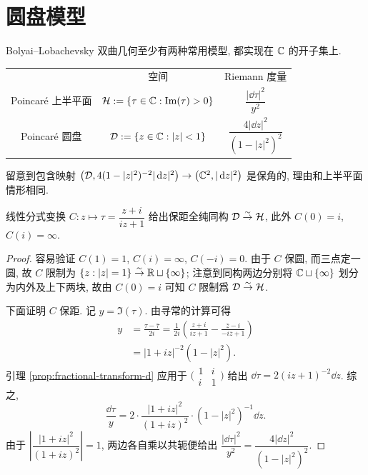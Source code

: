 \section{圆盘模型}\label{sec:disc-model} 
Bolyai--Lobachevsky 双曲几何至少有两种常用模型, 都实现在 $\mathbb{C}$ 的开子集上. 
\begin{center}\begin{tabular}{c|c|c}
	& 空间 & Riemann 度量 \\[5pt]
	Poincaré 上半平面 & $\mathcal{H} := \left\{ \tau \in \mathbb{C}: \operatorname{Im}(\tau) > 0 \right\}$ & $\dfrac{|\dd \tau|^2}{y^2}$ \\[5pt]
	Poincaré 圆盘 & $\mathcal{D} := \left\{ z \in \mathbb{C}: |z| < 1 \right\}$ & $\dfrac{4 |\dd z|^2}{(1 - |z|^2)^2}$
\end{tabular}\end{center}

留意到包含映射 $\left( \mathcal{D}, 4(1 - |z|^2)^{-2} |\mathop{}\!\mathrm{d} z|^2 \right) \to \left( \mathbb{C}^2, |\mathop{}\!\mathrm{d} z|^2 \right)$ 是保角的, 理由和上半平面情形相同.

\begin{proposition}\label{prop:hyperbolic-models}
	线性分式变换 $C: z \mapsto \tau = \dfrac{z+i}{iz+1}$ 给出保距全纯同构 $\mathcal{D} \stackrel{\sim}{\rightarrow} \mathcal{H}$, 此外 $C(0)=i$, $C(i)=\infty$.
\end{proposition}
\begin{proof}
	容易验证 $C(1) = 1$, $C(i)=\infty$, $C(-i)=0$. 由于 $C$ 保圆, 而三点定一圆, 故 $C$ 限制为 $\{z: |z|=1 \} \stackrel{\sim}{\rightarrow} \mathbb{R} \sqcup \{\infty\}$; 注意到同构两边分别将 $\mathbb{C} \sqcup \{\infty\}$ 划分为内外及上下两块, 故由 $C(0)=i$ 可知 $C$ 限制爲 $\mathcal{D} \stackrel{\sim}{\rightarrow} \mathcal{H}$.
	
	下面证明 $C$ 保距. 记 $y = \Im(\tau)$. 由寻常的计算可得
	\begin{align*}
	y & = \frac{\tau - \bar{\tau}}{2i} = \frac{1}{2i} \left( \frac{z+i}{iz+1} - \frac{\bar{z}-i}{-i\bar{z}+1} \right) \\
	& = |1+iz|^{-2} (1 - |z|^2).
	\end{align*}
	引理 \ref{prop:fractional-transform-d} 应用于 $\bigl( \begin{smallmatrix} 1 & i \\ i & 1 \end{smallmatrix} \bigr)$ 给出 $\dd\tau = 2(iz+1)^{-2} \dd z$. 综之,
	\[ \frac{\dd\tau}{y} = 2 \cdot \frac{|1+iz|^2}{(1+iz)^2} \cdot \left( 1 - |z|^2 \right)^{-1} \dd z. \]
	由于 $\left| \dfrac{|1+iz|^2}{(1+iz)^2}\right| = 1$, 两边各自乘以共轭便给出 $\dfrac{|\dd \tau|^2}{y^2} = \dfrac{4 |\dd z|^2}{(1 - |z|^2)^2}$.
\end{proof}

